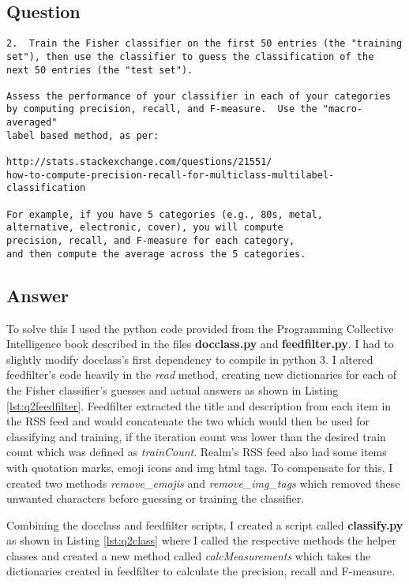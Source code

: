 \documentclass[letterpaper,11pt]{article}
\begin{document}
\subsection*{Question}

\begin{verbatim}
2.  Train the Fisher classifier on the first 50 entries (the "training
set"), then use the classifier to guess the classification of the
next 50 entries (the "test set").

Assess the performance of your classifier in each of your categories
by computing precision, recall, and F-measure.  Use the "macro-averaged"
label based method, as per:

http://stats.stackexchange.com/questions/21551/
how-to-compute-precision-recall-for-multiclass-multilabel-classification

For example, if you have 5 categories (e.g., 80s, metal,
alternative, electronic, cover), you will compute 
precision, recall, and F-measure for each category,
and then compute the average across the 5 categories.
\end{verbatim}

\subsection*{Answer}

To solve this I used the python code provided from the Programming Collective Intelligence book described in the files \textbf{docclass.py} and \textbf{feedfilter.py}. I had to slightly modify docclass's first dependency to compile in python 3. I altered feedfilter's code heavily in the \textit{read} method, creating new dictionaries for each of the Fisher classifier's guesses and actual answers as shown in Listing \ref{lst:q2feedfilter}. Feedfilter extracted the title and description from each item in the RSS feed and would concatenate the two which would then be used for classifying and training, if the iteration count was lower than the desired train count which was defined as \textit{trainCount}. Realm's RSS feed also had some items with quotation marks, emoji icons and img html tags. To compensate for this, I created two methods \textit{remove\_emojis} and \textit{remove\_img\_tags} which removed these unwanted characters before guessing or training the classifier.

Combining the docclass and feedfilter scripts, I created a script called \textbf{classify.py} as shown in Listing \ref{lst:q2class} where I called the respective methods the helper classes and created a new method called \textit{calcMeasurements} which takes the dictionaries created in feedfilter to calculate the precision, recall and F-measure.
\end{document}

